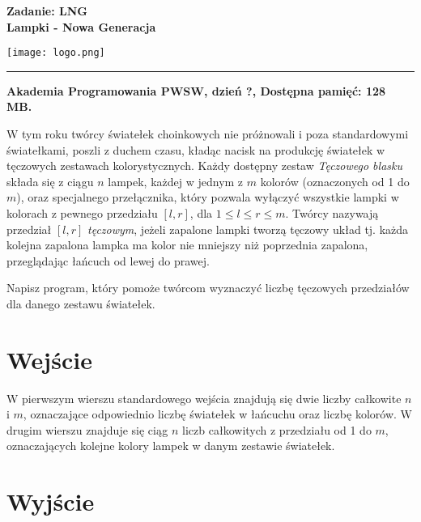 \documentclass[10pt]{article}
\begin{document}
    

    \noindent
    \begin{minipage}{0.5\textwidth}
        \LARGE{\textsf{\textbf{Zadanie: LNG\\Lampki - Nowa Generacja}}}
    \end{minipage}
    \begin{minipage}{0.5\textwidth}
        \begin{flushright}
            \texttt{[image: logo.png]}
        \end{flushright}
    \end{minipage}
    
    \noindent\rule{\textwidth}{0.4pt}
    
    \noindent\textbf{Akademia Programowania PWSW, dzień ?, Dostępna pamięć: 128 MB.}
    \vspace{1em}
    
    
    \noindent
    W tym roku twórcy światełek choinkowych nie próżnowali i poza standardowymi światełkami, poszli z duchem czasu, kładąc nacisk na produkcję światełek w tęczowych zestawach kolorystycznych. Każdy dostępny zestaw \textit{Tęczowego blasku} składa się z ciągu $n$ lampek, każdej w jednym z $m$ kolorów (oznaczonych od 1 do $m$), oraz specjalnego przełącznika, który pozwala wyłączyć wszystkie lampki w kolorach z pewnego przedziału $[l, r]$, dla $1\leq l \leq r \leq m$. Twórcy nazywają przedział $[l, r]$ \textit{tęczowym}, jeżeli zapalone lampki tworzą tęczowy układ tj. każda kolejna zapalona lampka ma kolor nie mniejszy niż poprzednia zapalona, przeglądając łańcuch od lewej do prawej.
    
    Napisz program, który pomoże twórcom wyznaczyć liczbę tęczowych przedziałów dla danego zestawu światełek.
    

    \section*{Wejście}
    
    W pierwszym wierszu standardowego wejścia znajdują się dwie liczby całkowite $n$ i $m$, oznaczające odpowiednio liczbę światełek w łańcuchu oraz liczbę kolorów. W drugim wierszu znajduje się ciąg $n$ liczb całkowitych z przedziału od 1 do $m$, oznaczających kolejne kolory lampek w danym zestawie światełek.


    \section*{Wyjście}
    
\end{document}
